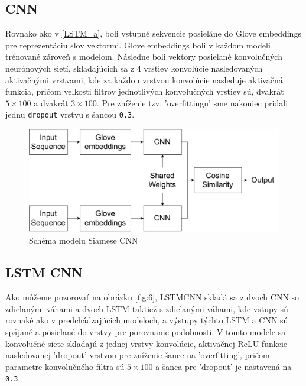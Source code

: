 \documentclass[a4paper, 16pt]{article}
\begin{document}
\subsection{CNN}
\label{CNN_a}
Rovnako ako v \ref{LSTM_a}, boli vstupné sekvencie posieláne do Glove embeddings pre reprezentáciu slov vektormi. Glove embeddings boli v každom modeli trénované zároveň s modelom. Následne boli vektory posielané konvolučných neurónových sietí, skladajúcich sa z 4 vrstiev konvolúcie nasledovaných aktivačnými vrstvami, kde za každou vrstvou konvolúcie nasleduje aktivačná funkcia, pričom veľkosti filtrov jednotlivých konvolučných vrstiev sú, dvakrát  $5 \times 100$ a dvakrát $3 \times 100$. Pre zníženie tzv. 'overfittingu' sme nakoniec pridali jednu \texttt{dropout} vrstvu s šancou \texttt{0.3}.
\begin{figure}[H]
    \centering
    \includegraphics[width=15cm]{CNN.pdf}
    \caption{Schéma modelu Siamese CNN}
    \label{fig:5}
\end{figure}

\subsection{LSTM CNN}
\label{LSTMCNN_a}
Ako môžeme pozorovať na obrázku \ref{fig:6}, LSTMCNN skladá sa z dvoch CNN so zdielanými váhami a dvoch LSTM taktiež s zdielanými váhami, kde vstupy sú rovnaké ako v predchádzajúcich modeloch, a výstupy týchto LSTM a CNN sú spájané a posielané do vrstvy pre porovnanie podobnosti. V tomto modele sa konvolučné siete skladajú z jednej vrstvy konvolúcie, aktivačnej ReLU funkcie nasledovanej 'dropout' vrstvou pre zníženie šance na 'overfitting', pričom parametre konvolučného filtra sú $5 \times 100$ a šanca pre 'dropout' je nastavená na \texttt{0.3}.
\end{document}
